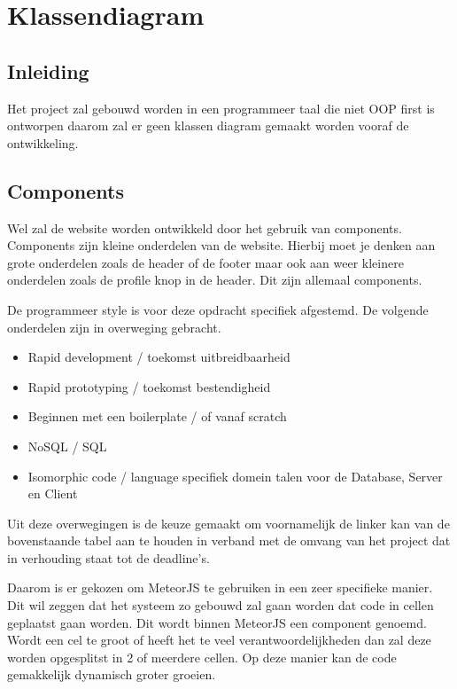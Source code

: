 \documentclass[]{report}
\begin{document}
\chapter{Klassendiagram}

\section{Inleiding}
Het project zal gebouwd worden in een programmeer taal die niet OOP first is ontworpen daarom zal er geen klassen diagram gemaakt worden vooraf de ontwikkeling.

\section{Components}
Wel zal de website worden ontwikkeld door het gebruik van components. Components zijn kleine onderdelen van de website. Hierbij moet je denken aan grote onderdelen zoals de header of de footer maar ook aan weer kleinere onderdelen zoals de profile knop in de header. Dit zijn allemaal components.

\vspace{1 cm}

De programmeer style is voor deze opdracht specifiek afgestemd. De volgende onderdelen zijn in overweging gebracht.

\begin{itemize}
	\item Rapid development / toekomst uitbreidbaarheid
	\item Rapid prototyping / toekomst bestendigheid
	\item Beginnen met een boilerplate / of vanaf scratch
	\item NoSQL / SQL
	\item Isomorphic code / language specifiek domein talen voor de Database, Server en Client
\end{itemize}

Uit deze overwegingen is de keuze gemaakt om voornamelijk de linker kan van de bovenstaande tabel aan te houden in verband met de omvang van het project dat in verhouding staat tot de deadline's. 

Daarom is er gekozen om MeteorJS te gebruiken in een zeer specifieke manier. Dit wil zeggen dat het systeem zo gebouwd zal gaan worden dat code in cellen geplaatst gaan worden. Dit wordt binnen MeteorJS een component genoemd. Wordt een cel te groot of heeft het te veel verantwoordelijkheden dan zal deze worden opgesplitst in 2 of meerdere cellen. Op deze manier kan de code gemakkelijk dynamisch groter groeien.
\end{document}
